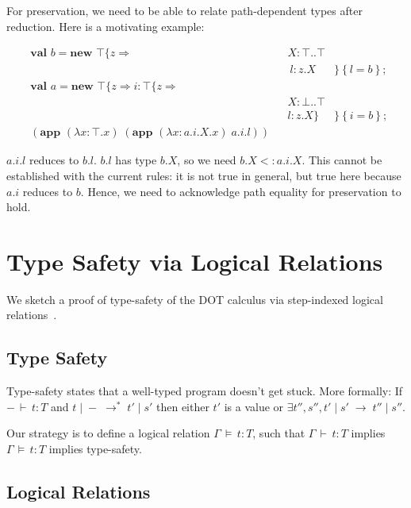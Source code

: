 \documentclass[9pt]{sigplanconf}
\newcommand{\ts}{\,\vdash\,}
\newcommand{\typ}{:}
\newcommand{\reduces}{\;\rightarrow\;}
\newcommand{\mlrefine}[2]{\{#1 \Rightarrow #2 \}}
\newcommand{\ldefs}[1]{\left\{#1\right\}}
\newcommand{\abs}[3]{\lambda #1\!:\!#2.#3}
\newcommand{\mlnew}[3]{\textbf{val }#1 = \textbf{new }#2 ;\;\\&#3}
\newcommand{\Ldecl}[3]{#1 : #2..#3}%
\newcommand{\ldecl}[2]{#1 : #2}
\newcommand{\Top}{\top}%
\newcommand{\Bot}{\bot}%
\newcommand{\reduction}[4]{#1 \operatorname{|} #2 \reduces #3 \operatorname{|} #4}
\newcommand{\app}[2]{(\textbf{app }#1\;#2)}
\newcommand{\reductionl}[5]{#1 \operatorname{|} #2 \;\rightarrow^{#5}\; #3 \operatorname{|} #4}
\newcommand{\ds}{\,\vDash\,}
\begin{document}
For preservation, we need to be able to relate path-dependent types
after reduction. Here is a motivating example:

\begin{align*}
&\mlnew b {\Top \mlrefine z {&&\Ldecl X \Top \Top&\\
&&&\ \ldecl l {z.X}&}\ldefs{l = b}}{
\mlnew a {\Top \mlrefine z {\ldecl i {\Top \mlrefine z {&&&\\
&&&\Ldecl X \Bot \Top\\
&&&\ldecl l {z.X}}}&}\ldefs{i = b}}}{
\app {(\abs x \Top x)} {\app {(\abs x {a.i.X} x)} {a.i.l}}}
\end{align*}

$a.i.l$ reduces to $b.l$. $b.l$ has type $b.X$, so we need $b.X <:
a.i.X$. This cannot be established with the current rules: it is not
true in general, but true here because $a.i$ reduces to $b$. Hence,
we need to acknowledge path equality for preservation to hold.

\section{Type Safety via Logical Relations}\label{dot-type-safety}
We sketch a proof of type-safety of the DOT calculus via step-indexed
logical relations~\cite{ahmed04,ahmed06,step_indexed_obj}.

\subsection{Type Safety}
Type-safety states that a well-typed program doesn't get stuck. More
formally: If $- \ts t \typ T$ and $\reductionl t - {t'} {s'} *$ then
either $t'$ is a value or $\exists t'', s'', \reduction {t'} {s'}
{t''} {s''}$.

Our strategy is to define a logical relation $\Gamma \ds t : T$, such
that $\Gamma \ts t : T$ implies $\Gamma \ds t : T$ implies
type-safety.

\subsection{Logical Relations}
\end{document}
